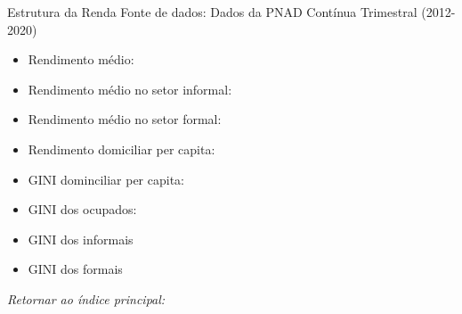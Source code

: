 \begin{frame}[label=_estrutura_renda]{Estrutura da Renda}
{\footnotesize Fonte de dados: Dados da PNAD Contínua Trimestral (2012-2020)}
\begin{footnotesize}
\begin{itemize}
\item{Rendimento médio: \hyperlink{_estrutura_renda_rendimento_medio_total}{}}
\item{Rendimento médio no setor informal: \hyperlink{_estrutura_renda_rendimento_medio_informal}{}}
\item{Rendimento médio no setor formal: \hyperlink{_estrutura_renda_rendimento_medio_formal}{}}
\item{Rendimento domiciliar per capita: \hyperlink{_estrutura_renda_rendimento_domiciliar_pc}{}}
\item{GINI dominciliar per capita: \hyperlink{_estrutura_renda_gini_rendimento_domiciliar_pc}{}}
\item{GINI dos ocupados: \hyperlink{_estrutura_renda_gini_ocupado}{}}
\item{GINI dos informais \hyperlink{_estrutura_renda_gini_informal}{}}
\item{GINI dos formais \hyperlink{_estrutura_renda_gini_formal}{}}
\end{itemize}
\end{footnotesize}

\begin{small}
\textit{Retornar ao índice principal: \hyperlink{indice_principal}{} }
\end{small}

\end{frame}

